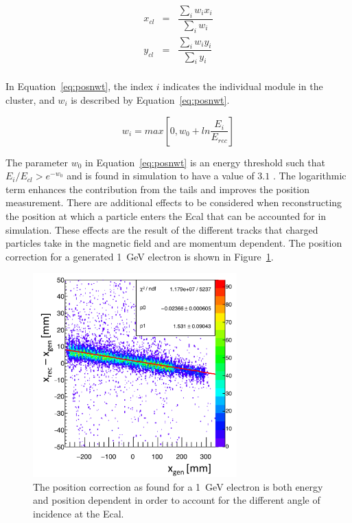 \documentclass[12pt]{report}
\begin{document}
\begin{eqnarray*}
\label{eq:posncalc}
x_{cl} & = & \dfrac{\sum_i w_i x_i}{\sum_i w_i}\\
y_{cl} & = & \dfrac{\sum_i w_i y_i}{\sum_i y_i}\\
\end{eqnarray*}

In Equation~\eqref{eq:posnwt}, the index $i$ indicates the individual module in the cluster, and $w_i$ is described by Equation~\eqref{eq:posnwt}.

\begin{equation}
\label{eq:posnwt}
w_i  =  max[0, w_0+ ln\dfrac{E_i}{E_{rec}}]
\end{equation}

The parameter $w_0$ in Equation~\eqref{eq:posnwt} is an energy threshold such that $E_i/E_{cl} > e^{-w_0}$ and is found in simulation to have a value of $3.1$ \cite{Garcon}. The logarithmic term enhances the contribution from the tails and improves the position measurement. There are additional effects to be considered when reconstructing the position at which a particle enters the Ecal that can be accounted for in simulation. These effects are the result of the different tracks that charged particles take in the magnetic field and are momentum dependent. The position correction for a generated 1~GeV electron is shown in Figure~\ref{Figure:xposn1gev}.

\begin{figure}[H]
  \centering
      \includegraphics[width=0.7\textwidth]{pics/performance/xposn1gev.png}
  \caption[Horizontal position correction for 1~GeV electrons]{The position correction as found for a 1~GeV electron is both energy and position dependent in order to account for the different angle of incidence at the Ecal.}
  \label{Figure:xposn1gev}
\end{figure}
\end{document}
